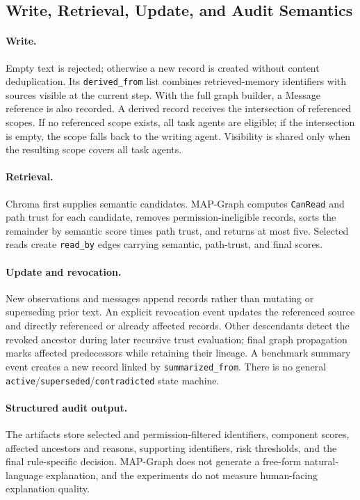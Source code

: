 \documentclass[letterpaper]{article} %
\begin{document}
\subsection{Write, Retrieval, Update, and Audit Semantics}
\label{app:operation-details}

\paragraph{Write.}
Empty text is rejected; otherwise a new record is created without content
deduplication.  Its \texttt{derived\_from} list combines retrieved-memory
identifiers with sources visible at the current step.  With the full graph
builder, a Message reference is also recorded.  A derived record receives the
intersection of referenced scopes.  If no referenced scope exists, all task
agents are eligible; if the intersection is empty, the scope falls back to the
writing agent.  Visibility is shared only when the resulting scope covers all
task agents.

\paragraph{Retrieval.}
Chroma first supplies semantic candidates.  MAP-Graph computes
\texttt{CanRead} and path trust for each candidate, removes
permission-ineligible records, sorts the remainder by semantic score times
path trust, and returns at most five.  Selected reads create
\texttt{read\_by} edges carrying semantic, path-trust, and final scores.

\paragraph{Update and revocation.}
New observations and messages append records rather than mutating or
superseding prior text.  An explicit revocation event updates the referenced
source and directly referenced or already affected records.  Other descendants
detect the revoked ancestor during later recursive trust evaluation; final
graph propagation marks affected predecessors while retaining their lineage.
A benchmark summary event creates a new record linked by
\texttt{summarized\_from}.  There is no general
\texttt{active}/\texttt{superseded}/\texttt{contradicted} state machine.

\paragraph{Structured audit output.}
The artifacts store selected and permission-filtered identifiers, component
scores, affected ancestors and reasons, supporting identifiers, risk
thresholds, and the final rule-specific decision.  MAP-Graph does not generate
a free-form natural-language explanation, and the experiments do not measure
human-facing explanation quality.
\end{document}
